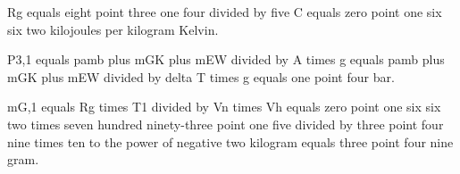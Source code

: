 Rg equals eight point three one four divided by five C equals zero point one six six two kilojoules per kilogram Kelvin.

P3,1 equals pamb plus mGK plus mEW divided by A times g equals pamb plus mGK plus mEW divided by delta T times g equals one point four bar.

mG,1 equals Rg times T1 divided by Vn times Vh equals zero point one six six two times seven hundred ninety-three point one five divided by three point four nine times ten to the power of negative two kilogram equals three point four nine gram.
